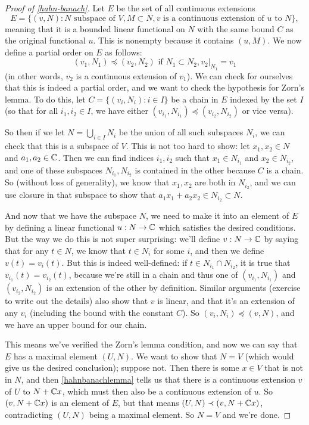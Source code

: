 \begin{proof}[Proof of \cref{hahn-banach}]
Let $E$ be the set of all continuous extensions 
\[
    E = \{(v, N): N \text{ subspace of }V, M \subset N, v \text{ is a continuous extension of }u \text{ to }N\},
\]
meaning that it is a bounded linear functional on $N$ with the same bound $C$ as the original functional $u$. This is nonempty because it contains $(u, M)$. We now define a partial order on $E$ as follows:
\[
    (v_1, N_1) \preceq (v_2, N_2) \text{ if }N_1 \subset N_2, v_2|_{N_1} = v_1
\]
(in other words, $v_2$ is a continuous extension of $v_1$). We can check for ourselves that this is indeed a partial order, and we want to check the hypothesis for Zorn's lemma. To do this, let $C = \{(v_i, N_i): i \in I\}$ be a chain in $E$ indexed by the set $I$ (so that for all $i_1, i_2 \in I$, we have either $(v_{i_1}, N_{i_1}) \preceq (v_{i_2}, N_{i_2})$ or vice versa). 

So then if we let $N = \bigcup_{i \in I} N_i$ be the union of all such subspaces $N_i$, we can check that this is a subspace of $V$. This is not too hard to show: let $x_1, x_2 \in N$ and $a_1, a_2 \in \mathbb C$. Then we can find indices $i_1, i_2$ such that $x_1 \in N_{i_1}$ and $x_2 \in N_{i_2}$, and one of these subspaces $N_{i_1}, N_{i_2}$ is contained in the other because $C$ is a chain. So (without loss of generality), we know that $x_1, x_2$ are both in $N_{i_2}$, and we can use closure in that subspace to show that $a_1x_1 + a_2x_2 \in N_{i_2} \subset N$.

And now that we have the subspace $N$, we need to make it into an element of $E$ by defining a linear functional $u: N \to \mathbb C$ which satisfies the desired conditions. But the way we do this is not super surprising: we'll define $v: N \to \mathbb C$ by saying that for any $t \in N$, we know that $t \in N_i$ for some $i$, and then we define $v(t) = v_i(t)$. But this is indeed well-defined: if $t \in N_{i_1} \cap N_{i_2}$, it is true that $v_{i_1}(t) = v_{i_2}(t)$, because we're still in a chain and thus one of $(v_{i_1}, N_{i_1})$ and $(v_{i_2}, N_{i_2})$ is an extension of the other by definition. Similar arguments (exercise to write out the details) also show that $v$ is linear, and that it's an extension of any $v_i$ (including the bound with the constant $C$). So $(v_i, N_i) \preceq (v, N)$, and we have an upper bound for our chain.

This means we've verified the Zorn's lemma condition, and now we can say that $E$ has a maximal element $(U, N)$. We want to show that $N = V$ (which would give us the desired conclusion); suppose not. Then there is some $x \in V$ that is not in $N$, and then \cref{hahnbanachlemma} tells us that there is a continuous extension $v$ of $U$ to $N + \mathbb C x$, which must then also be a continuous extension of $u$. So $(v, N + \mathbb C x)$ is an element of $E$, but that means $(U, N) \prec (v, N + \mathbb C x)$, contradicting $(U, N)$ being a maximal element. So $N = V$ and we're done. 
\end{proof}

